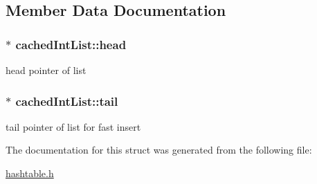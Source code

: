 \subsection{Member Data Documentation}
\subsubsection[{\texorpdfstring{head}{head}}]{$\ast$ cached\+Int\+List\+::head}\hypertarget{structcachedIntList_ac4cce5e5d07c4b23683046e77a0fbe6a}{}\label{structcachedIntList_ac4cce5e5d07c4b23683046e77a0fbe6a}
head pointer of list 
\subsubsection[{\texorpdfstring{tail}{tail}}]{$\ast$ cached\+Int\+List\+::tail}\hypertarget{structcachedIntList_adbe1df126c4425546e3a2b4366784c9d}{}\label{structcachedIntList_adbe1df126c4425546e3a2b4366784c9d}
tail pointer of list for fast insert 

The documentation for this struct was generated from the following file\+:\begin{DoxyCompactItemize}
\item 
\hyperlink{hashtable_8h}{hashtable.\+h}\end{DoxyCompactItemize}
